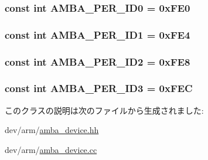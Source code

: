 \label{classAmbaDevice_aed8b9f80686a3bd7cdafc05556bb3bbc}
\hypertarget{classAmbaDevice_a2ef71e98174278bd1964330103e718fd}{
\subsubsection[{AMBA\_\-PER\_\-ID0}]{\setlength{\rightskip}{0pt plus 5cm}const int {\bf AMBA\_\-PER\_\-ID0} = 0xFE0}}
\label{classAmbaDevice_a2ef71e98174278bd1964330103e718fd}
\hypertarget{classAmbaDevice_a0b1e80bd6a1a75a77ce15e635f4ce202}{
\subsubsection[{AMBA\_\-PER\_\-ID1}]{\setlength{\rightskip}{0pt plus 5cm}const int {\bf AMBA\_\-PER\_\-ID1} = 0xFE4}}
\label{classAmbaDevice_a0b1e80bd6a1a75a77ce15e635f4ce202}
\hypertarget{classAmbaDevice_a8a256ec5e875dd4a35b512e1e8b543da}{
\subsubsection[{AMBA\_\-PER\_\-ID2}]{\setlength{\rightskip}{0pt plus 5cm}const int {\bf AMBA\_\-PER\_\-ID2} = 0xFE8}}
\label{classAmbaDevice_a8a256ec5e875dd4a35b512e1e8b543da}
\hypertarget{classAmbaDevice_a8f88e72f8e921732c961755c7e97c852}{
\subsubsection[{AMBA\_\-PER\_\-ID3}]{\setlength{\rightskip}{0pt plus 5cm}const int {\bf AMBA\_\-PER\_\-ID3} = 0xFEC}}
\label{classAmbaDevice_a8f88e72f8e921732c961755c7e97c852}


このクラスの説明は次のファイルから生成されました:\begin{DoxyCompactItemize}
\item 
dev/arm/\hyperlink{amba__device_8hh}{amba\_\-device.hh}\item 
dev/arm/\hyperlink{amba__device_8cc}{amba\_\-device.cc}\end{DoxyCompactItemize}
